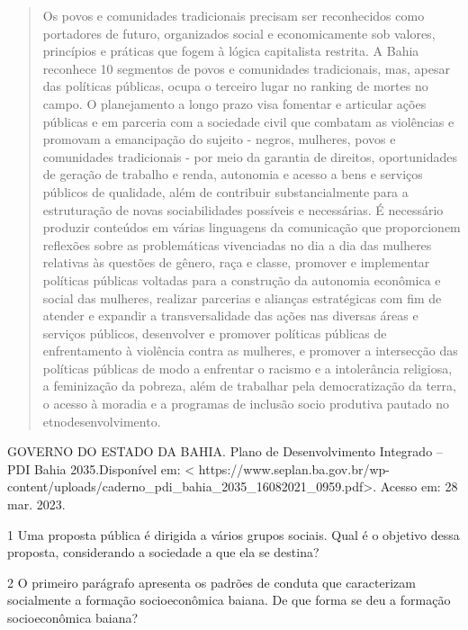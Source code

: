 \begin{itemize}
\begin{quote}
Os povos e comunidades tradicionais precisam ser reconhecidos como
portadores de futuro, organizados social e economicamente sob valores,
princípios e práticas que fogem à lógica capitalista restrita. A Bahia
reconhece 10 segmentos de povos e comunidades tradicionais, mas, apesar
das políticas públicas, ocupa o terceiro lugar no ranking de mortes no
campo. O planejamento a longo prazo visa fomentar e articular ações
públicas e em parceria com a sociedade civil que combatam as violências
e promovam a emancipação do sujeito - negros, mulheres, povos e
comunidades tradicionais - por meio da garantia de direitos,
oportunidades de geração de trabalho e renda, autonomia e acesso a bens
e serviços públicos de qualidade, além de contribuir substancialmente
para a estruturação de novas sociabilidades possíveis e necessárias. É
necessário produzir conteúdos em várias linguagens da comunicação que
proporcionem reflexões sobre as problemáticas vivenciadas no dia a dia
das mulheres relativas às questões de gênero, raça e classe, promover e
implementar políticas públicas voltadas para a construção da autonomia
econômica e social das mulheres, realizar parcerias e alianças
estratégicas com fim de atender e expandir a transversalidade das ações
nas diversas áreas e serviços públicos, desenvolver e promover políticas
públicas de enfrentamento à violência contra as mulheres, e promover a
intersecção das políticas públicas de modo a enfrentar o racismo e a
intolerância religiosa, a feminização da pobreza, além de trabalhar pela
democratização da terra, o acesso à moradia e a programas de inclusão
socio produtiva pautado no etnodesenvolvimento.
\end{quote}

GOVERNO DO ESTADO DA BAHIA. Plano de Desenvolvimento Integrado -- PDI
Bahia 2035.Disponível em: \textless{}
https://www.seplan.ba.gov.br/wp-content/uploads/caderno\_pdi\_bahia\_2035\_16082021\_0959.pdf\textgreater{}.
Acesso em: 28 mar. 2023.

\num{1} Uma proposta pública é dirigida a vários grupos sociais. Qual é o
objetivo dessa proposta, considerando a sociedade a que ela se destina?



\num{2} O primeiro parágrafo apresenta os padrões de conduta que caracterizam
socialmente a formação socioeconômica baiana. De que forma se deu a
formação socioeconômica baiana?


\end{itemize}

